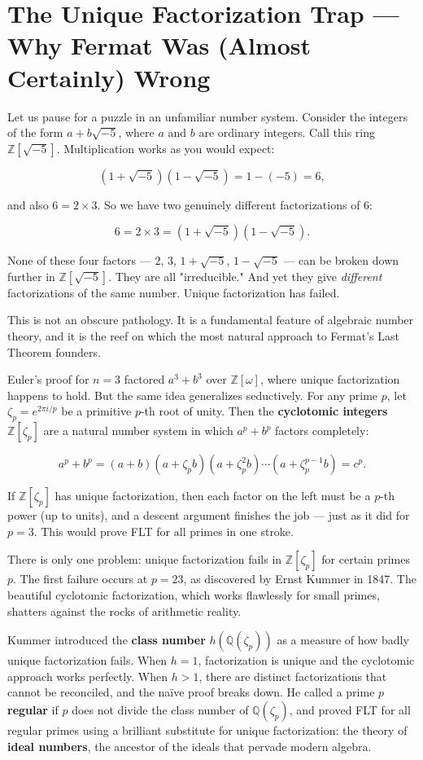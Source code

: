 \documentclass[11pt,twoside,openright]{book}
\theoremstyle{definition}
\theoremstyle{remark}
\begin{document}
\section{The Unique Factorization Trap --- Why Fermat Was (Almost Certainly) Wrong}

Let us pause for a puzzle in an unfamiliar number system. Consider the integers of the form $a + b\sqrt{-5}$, where $a$ and $b$ are ordinary integers. Call this ring $\mathbb{Z}[\sqrt{-5}]$. Multiplication works as you would expect:

\[(1 + \sqrt{-5})(1 - \sqrt{-5}) = 1 - (-5) = 6,\]

and also $6 = 2 \times 3$. So we have two genuinely different factorizations of $6$:

\[6 = 2 \times 3 = (1 + \sqrt{-5})(1 - \sqrt{-5}).\]

None of these four factors --- $2$, $3$, $1 + \sqrt{-5}$, $1 - \sqrt{-5}$ --- can be broken down further in $\mathbb{Z}[\sqrt{-5}]$. They are all "irreducible." And yet they give \textit{different} factorizations of the same number. Unique factorization has failed.


This is not an obscure pathology. It is a fundamental feature of algebraic number theory, and it is the reef on which the most natural approach to Fermat's Last Theorem founders.

Euler's proof for $n = 3$ factored $a^3 + b^3$ over $\mathbb{Z}[\omega]$, where unique factorization happens to hold. But the same idea generalizes seductively. For any prime $p$, let $\zeta_p = e^{2\pi i/p}$ be a primitive $p$-th root of unity. Then the \textbf{cyclotomic integers} $\mathbb{Z}[\zeta_p]$ are a natural number system in which $a^p + b^p$ factors completely:

\[a^p + b^p = (a + b)(a + \zeta_p b)(a + \zeta_p^2 b) \cdots (a + \zeta_p^{p-1} b) = c^p.\]

If $\mathbb{Z}[\zeta_p]$ has unique factorization, then each factor on the left must be a $p$-th power (up to units), and a descent argument finishes the job --- just as it did for $p = 3$. This would prove FLT for all primes in one stroke.

There is only one problem: unique factorization fails in $\mathbb{Z}[\zeta_p]$ for certain primes $p$. The first failure occurs at $p = 23$, as discovered by Ernst Kummer in 1847. The beautiful cyclotomic factorization, which works flawlessly for small primes, shatters against the rocks of arithmetic reality.

Kummer introduced the \textbf{class number} $h(\mathbb{Q}(\zeta_p))$ as a measure of how badly unique factorization fails. When $h = 1$, factorization is unique and the cyclotomic approach works perfectly. When $h > 1$, there are distinct factorizations that cannot be reconciled, and the na\"ive proof breaks down. He called a prime $p$ \textbf{regular} if $p$ does not divide the class number of $\mathbb{Q}(\zeta_p)$, and proved FLT for all regular primes using a brilliant substitute for unique factorization: the theory of \textbf{ideal numbers}, the ancestor of the ideals that pervade modern algebra.
\end{document}
